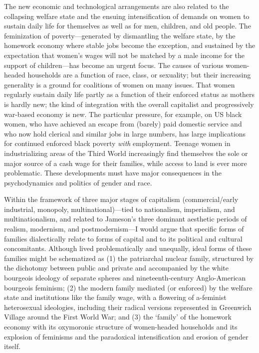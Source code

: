 \documentclass[DIV=12,%
               BCOR=10mm,%
               headinclude=false,%
               footinclude=false,open=any,%
               fontsize=11pt,%
               twoside,%
               paper=210mm:11in]%
               {scrbook}
\newcommand*{\Slash}{\slash\hspace{0pt}}
\begin{document}
The new economic and technological arrangements are also related to the collapsing welfare state and the ensuing intensification of demands on women to sustain daily life for themselves as well as for men, children, and old people. The feminization of poverty—generated by dismantling the welfare state, by the homework economy where stable jobs become the exception, and sustained by the expectation that women’s wages will not be matched by a male income for the support of children—has become an urgent focus. The causes of various women-headed households are a function of race, class, or sexuality; but their increasing generality is a ground for coalitions of women on many issues. That women regularly sustain daily life partly as a function of their enforced status as mothers is hardly new; the kind of integration with the overall capitalist and progressively war-based economy is new. The particular pressure, for example, on US black women, who have achieved an escape from (barely) paid domestic service and who now hold clerical and similar jobs in large numbers, has large implications for continued enforced black poverty \emph{with} employment. Teenage women in industrializing areas of the Third World increasingly find themselves the sole or major source of a cash wage for their families, while access to land is ever more problematic. These developments must have major consequences in the psychodynamics and politics of gender and race.


Within the framework of three major stages of capitalism (commercial\Slash{}early industrial, monopoly, multinational)—tied to nationalism, imperialism, and multinationalism, and related to Jameson’s three dominant aesthetic periods of realism, modernism, and postmodernism—I would argue that specific forms of families dialectically relate to forms of capital and to its political and cultural concomitants. Although lived problematically and unequally, ideal forms of these families might be schematized as (1) the patriarchal nuclear family, structured by the dichotomy between public and private and accompanied by the white bourgeois ideology of separate spheres and nineteenth-century Anglo-American bourgeois feminism; (2) the modern family mediated (or enforced) by the welfare state and institutions like the family wage, with a flowering of a-feminist heterosexual ideologies, including their radical versions represented in Greenwich Village around the First World War; and (3) the ‘family’ of the homework economy with its oxymoronic structure of women-headed households and its explosion of feminisms and the paradoxical intensification and erosion of gender itself.
\end{document}
